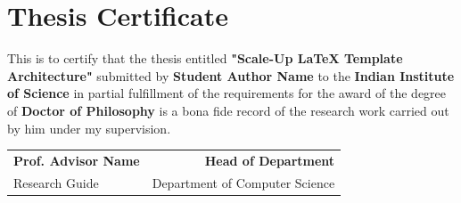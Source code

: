 \chapter*{Thesis Certificate}
This is to certify that the thesis entitled \textbf{"Scale-Up LaTeX Template Architecture"} submitted by \textbf{Student Author Name} to the \textbf{Indian Institute of Science} in partial fulfillment of the requirements for the award of the degree of \textbf{Doctor of Philosophy} is a bona fide record of the research work carried out by him under my supervision.

\vspace{2cm}
\noindent
\begin{tabular*}{\textwidth}{@{\extracolsep{\fill}}lr}
    \textbf{Prof. Advisor Name} & \textbf{Head of Department} \\
    Research Guide & Department of Computer Science
\end{tabular*}
